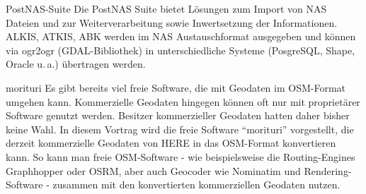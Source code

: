 %
%
{PostNAS-Suite}%
{}%
{Die PostNAS Suite bietet Lösungen zum Import von NAS Dateien und zur Weiterverarbeitung
sowie Inwertsetzung der Informationen. ALKIS, ATKIS, ABK werden im NAS Austauschformat
ausgegeben und können via ogr2ogr (GDAL-Bibliothek) in unterschiedliche Systeme
(PosgreSQL, Shape, Oracle u.\,a.) übertragen werden.
}

%
{morituri}%
{}%
{Es gibt bereits viel freie Software, die mit Geodaten im OSM-Format umgehen kann.
Kommerzielle Geodaten hingegen können oft nur mit proprietärer Software genutzt werden.
Besitzer kommerzieller Geodaten hatten daher bisher keine Wahl.
In diesem Vortrag wird die freie Software "`morituri"' vorgestellt, die derzeit kommerzielle Geodaten von HERE in das OSM-Format konvertieren kann.
So kann man freie OSM-Software - wie beispielsweise die Routing-Engines Graphhopper oder OSRM, aber auch Geocoder wie Nominatim und Rendering-Software - zusammen mit den konvertierten kommerziellen Geodaten nutzen.}

\newpage

\vfill
{}

\vfill
